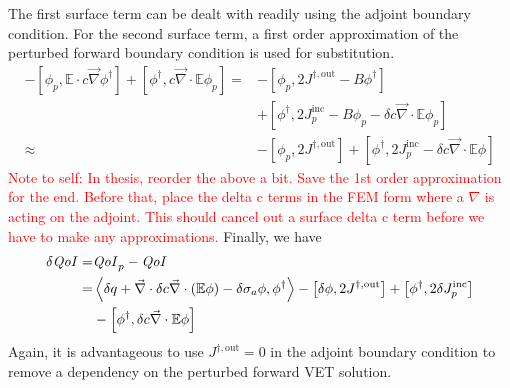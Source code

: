 \documentclass{article}
\newcommand{\bra}{\left\langle}
\newcommand{\ket}{\right\rangle}
\newcommand{\sbra}{\left[}
\newcommand{\sket}{\right]}
\renewcommand{\div}{\vec{\nabla} \cdot}
\newcommand{\grad}{\vec{\nabla}}
\newcommand{\Edd}{\mathbb{E}}
\newcommand{\siga}{\sigma_a}
\newcommand{\isigt}{c}
\newcommand{\scalSource}{q}
\newcommand{\qoi}{{\it QoI}\xspace}
\newcommand{\comment}[2]{\marginpar{\textcolor{#2}{$\star$}}\textcolor{#2}{#1}\newline}
\newcommand{\iwh}[1]{\comment{#1}{red}}
\newcommand{\iwh}[1]{\phantom{a}}
\begin{document}
The first surface term can be dealt with readily using the adjoint boundary condition. For the second surface term, a first order approximation of the perturbed forward boundary condition is used for substitution.
\begin{equation}
\begin{split}
 - \sbra \phi_p, \Edd \cdot \isigt \grad \phi^\dag \sket  + \sbra \phi^\dag, \isigt \div \Edd \phi_p \sket 
=&- \sbra \phi_p, 2J^{\dag,\text{out}} - B \phi^\dag \sket \\ &+ \sbra \phi^\dag, 2 J_p^{\text{inc}} - B \phi_p - \delta \isigt \div \Edd \phi_p \sket \\
\approx&- \sbra \phi_p, 2J^{\dag,\text{out}} \sket + \sbra \phi^\dag, 2 J_p^{\text{inc}} - \delta \isigt \div \Edd \phi \sket 
\end{split}
\end{equation}
\iwh{Note to self: In thesis, reorder the above a bit. Save the 1st order approximation for the end. Before that, place the delta c terms in the FEM form where a $\nabla$ is acting on the adjoint. This should cancel out a surface delta c term before we have to make any approximations.}
Finally, we have
\begin{equation}
\label{QoIVETAdj}
\begin{split}
\delta \qoi =& \qoi_p - \qoi \\ 
=& \bra \delta \scalSource + \div \delta \isigt \div \left( \Edd \phi \right)  - \delta \siga \phi, \phi^\dag \ket 
- \sbra \delta \phi, 2J^{\dag,\text{out}} \sket + \sbra \phi^\dag, 2 \delta J_p^{\text{inc}} \sket \\
& - \sbra \phi^\dag, \delta \isigt \div \Edd \phi \sket 
\end{split}
\end{equation}
Again, it is advantageous to use $J^{\dag,\text{out}}=0$ in the adjoint boundary condition to remove a dependency on the 
perturbed forward VET solution.
\end{document}
